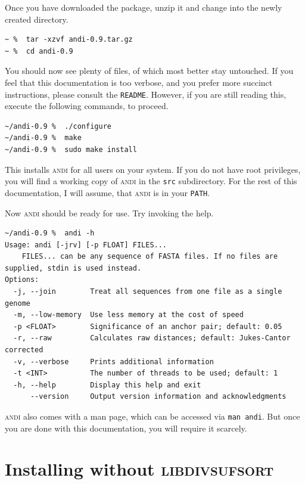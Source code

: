 \documentclass[a4paper,
  10pt,
  english,
  DIV=12,
  BCOR=8mm]{scrbook}
\newcommand{\algo}[1]{\textsc{{#1}}}
\newcommand{\andi}{\algo{andi} }
\begin{document}
Once you have downloaded the package, unzip it and change into the newly created directory. 

\begin{lstlisting}
~ %  tar -xzvf andi-0.9.tar.gz
~ %  cd andi-0.9
\end{lstlisting}

\noindent You should now see plenty of files, of which most better stay untouched. If you feel that this documentation is too verbose, and you prefer more succinct instructions, please consult the \lstinline$README$. However, if you are still reading this, execute the following commands, to proceed.

\begin{lstlisting}
~/andi-0.9 %  ./configure
~/andi-0.9 %  make
~/andi-0.9 %  sudo make install
\end{lstlisting}

\noindent This installs \andi for all users on your system. If you do not have root privileges, you will find a working copy of \andi in the \lstinline$src$ subdirectory. For the rest of this documentation, I will assume, that \andi is in your \textdollar\lstinline!PATH!.

Now \andi should be ready for use. Try invoking the help.

\begin{lstlisting}
~/andi-0.9 %  andi -h
Usage: andi [-jrv] [-p FLOAT] FILES...
	FILES... can be any sequence of FASTA files. If no files are supplied, stdin is used instead.
Options:
  -j, --join        Treat all sequences from one file as a single genome
  -m, --low-memory  Use less memory at the cost of speed
  -p <FLOAT>        Significance of an anchor pair; default: 0.05
  -r, --raw         Calculates raw distances; default: Jukes-Cantor corrected
  -v, --verbose     Prints additional information
  -t <INT>          The number of threads to be used; default: 1
  -h, --help        Display this help and exit
      --version     Output version information and acknowledgments
\end{lstlisting}

\noindent \andi also comes with a man page, which can be accessed via \lstinline$man andi$. But once you are done with this documentation, you will require it scarcely.

\section{Installing without \algo{libdivsufsort}} \label{sub:wo-divsufsort}
\end{document}
